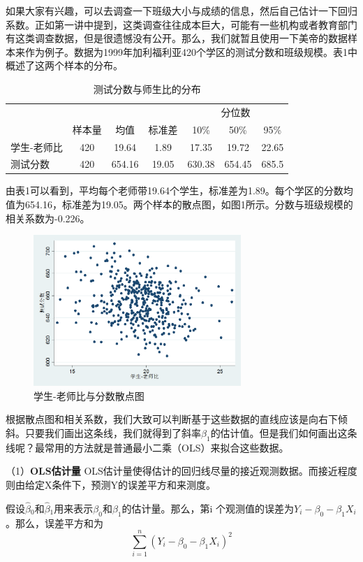 \documentclass[cn,12pt,math=newtx,citestyle=gb7714-2015,bibstyle=gb7714-2015]{elegantbook}
\begin{document}
	如果大家有兴趣，可以去调查一下班级大小与成绩的信息，然后自己估计一下回归系数。正如第一讲中提到，这类调查往往成本巨大，可能有一些机构或者教育部门有这类调查数据，但是很遗憾没有公开。那么，我们就暂且使用一下美帝的数据样本来作为例子。数据为1999年加利福利亚420个学区的测试分数和班级规模。表1中概述了这两个样本的分布。
	\begin{table}[htbp]
		\caption{测试分数与师生比的分布}\label{tab:digit}
		\centering
		\begin{tabular}{lcccccc}
			\hline
			&&&&\multicolumn{3}{c}{分位数}\\
			\cline{5-7}
			&样本量&均值&标准差&10\%&50\%&95\%\\
			\cline{1-7}
			学生-老师比&420&19.64&1.89&17.35&19.72&22.65\\
			\cline{1-7}
			测试分数&420&654.16&19.05&630.38&654.45&685.5\\
			\hline
		\end{tabular}
	\end{table}
	
	由表1可以看到，平均每个老师带19.64个学生，标准差为1.89。每个学区的分数均值为654.16，标准差为19.05。两个样本的散点图，如图1所示。分数与班级规模的相关系数为-0.226。
	\begin{figure}[htbp]
		\centering
		\includegraphics[width=0.7\textwidth]{score.png}
		\caption{学生-老师比与分数散点图}\label{fig:digit}
	\end{figure}
	
	根据散点图和相关系数，我们大致可以判断基于这些数据的直线应该是向右下倾斜。只要我们画出这条线，我们就得到了斜率$\beta_1$的估计值。但是我们如何画出这条线呢？最常用的方法就是普通最小二乘（OLS）来拟合这些数据。
	
	（1）\textbf{OLS估计量}
	OLS估计量使得估计的回归线尽量的接近观测数据。而接近程度则由给定X条件下，预测Y的误差平方和来测度。
	
	假设$\hat\beta{_0}$和$\hat\beta{_1}$用来表示$\beta_0$和$\beta_1$的估计量。那么，第i 个观测值的误差为$Y_i-\beta_0-\beta_1X_i$。那么，误差平方和为
	\begin{equation}
		\sum_{i=1}^n{(Y_i-\beta_0-\beta_1X_i)^2}
	\end{equation}
	
\end{document}

